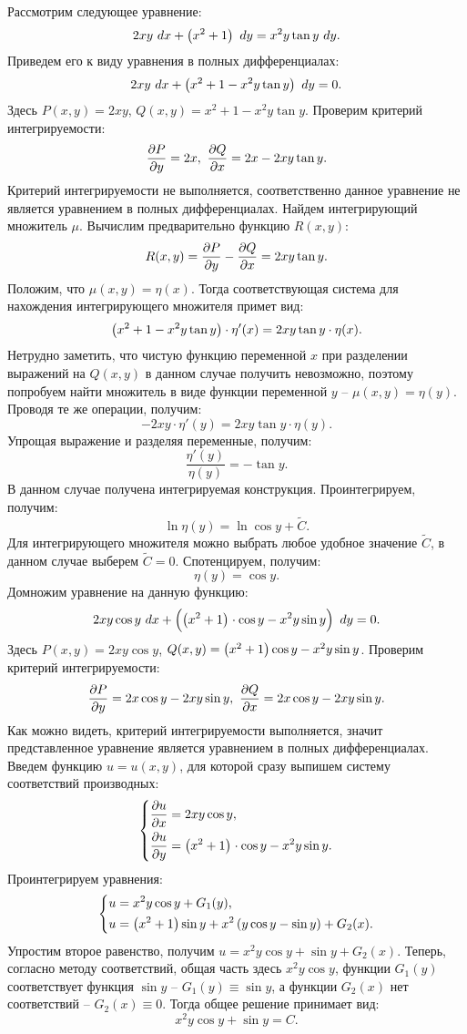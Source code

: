 		Рассмотрим следующее уравнение:
		\[ 2xy ~ dx + \left( x^2 + 1 \right) ~ dy = x^2 y \tan{y} ~ dy. \]
    	Приведем его к виду уравнения в полных дифференциалах:
    	\[ 2xy ~ dx + \left( x^2 + 1 - x^2 y \tan{y} \right) ~ dy = 0. \]
    	Здесь $P(x, y) = 2xy$, $Q(x, y) = x^2 + 1 - x^2 y \tan{y}$. Проверим критерий интегрируемости:
    	\[ \dfrac{\partial P}{\partial y} = 2x, ~ \dfrac{\partial Q}{\partial x} = 2x - 2xy \tan{y}. \]
    	Критерий интегрируемости не выполняется, соответственно данное уравнение не является уравнением в полных дифференциалах. Найдем интегрирующий множитель $\mu$. Вычислим предварительно функцию $R(x, y)$: 
    	\[ R(x, y) = \dfrac{\partial P}{\partial y} - \dfrac{\partial Q}{\partial x} = 2xy \tan{y}. \]
    	Положим, что $\mu(x, y) = \eta(x)$. Тогда соответствующая система для нахождения интегрирующего множителя примет вид:
    	\[ \left( x^2 + 1 - x^2 y \tan{y} \right) \cdot \eta'(x) = 2xy \tan{y} \cdot \eta(x). \]
    	Нетрудно заметить, что чистую функцию переменной $x$ при разделении выражений на $Q(x, y)$ в данном случае получить невозможно, поэтому попробуем найти множитель в виде функции переменной $y$ -- $\mu(x, y) = \eta(y)$. Проводя те же операции, получим:
    	\[ -2xy \cdot \eta'(y) = 2xy \tan{y} \cdot \eta(y). \]
    	Упрощая выражение и разделяя переменные, получим:
    	\[ \frac{\eta'(y)}{\eta(y)} = -\tan{y}. \]
    	В данном случае получена интегрируемая конструкция. Проинтегрируем, получим:
    	\[ \ln{\eta(y)} = \ln{\cos{y}} + \tilde{C}. \]
    	Для интегрирующего множителя можно выбрать любое удобное значение $\tilde{C}$, в данном случае выберем $\tilde{C} = 0$. Спотенцируем, получим:
    	\[ \eta(y) = \cos{y}. \]
    	Домножим уравнение на данную функцию:
    	\[ 2xy \cos{y} ~ dx + \left( \left( x^2 + 1 \right)^{\vphantom{2}} \cdot \cos{y} - x^2 y \sin{y} \right) ~ dy = 0. \]
    	Здесь $P(x, y) = 2xy \cos{y}$, $Q(x, y) = \left( x^2 + 1 \right) \cos{y} - x^2 y \sin{y}$. Проверим критерий интегрируемости:
    	\[ \dfrac{\partial P}{\partial y} = 2x \cos{y} - 2xy \sin{y}, ~ \dfrac{\partial Q}{\partial x} = 2x \cos{y} - 2xy \sin{y}. \]
    	Как можно видеть, критерий интегрируемости выполняется, значит представленное уравнение является уравнением в полных дифференциалах. Введем функцию $u = u(x, y)$, для которой сразу выпишем систему соответствий производных:
    	\[ \left\lbrace \begin{split} \dfrac{\partial u}{\partial x} &= 2xy \cos{y}, \\ \dfrac{\partial u}{\partial y} &= \left( x^2 + 1 \right)^{\vphantom{2}} \cdot \cos{y} - x^2 y \sin{y}. \end{split} \right. \]
    	Проинтегрируем уравнения:
    	\[ \left\lbrace \begin{split} 
    		u &= x^2 y \cos{y} + G_1(y), \\
    		u &= \left( x^2 + 1 \right) \sin{y} + x^2 \left( y \cos{y} - \sin{y} \right) + G_2(x). 
    	\end{split} \right.\]
    	Упростим второе равенство, получим $u = x^2 y \cos{y} + \sin{y} + G_2(x)$. Теперь, согласно методу соответствий, общая часть здесь $x^2 y \cos{y}$, функции $G_1(y)$ соответствует функция $\sin{y}$ -- $G_1(y) \equiv \sin{y}$, а функции $G_2(x)$ нет соответствий -- $G_2(x) \equiv 0$. Тогда общее решение принимает вид:
    	\[ x^2 y \cos{y} + \sin{y} = C. \]

    \pagebreak